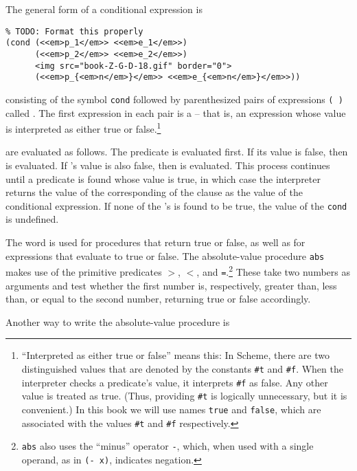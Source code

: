 The general form of a conditional expression is

\begin{verbatim}
% TODO: Format this properly
(cond (<<em>p_1</em>> <<em>e_1</em>>)
      (<<em>p_2</em>> <<em>e_2</em>>)
      <img src="book-Z-G-D-18.gif" border="0">
      (<<em>p_{<em>n</em>}</em>> <<em>e_{<em>n</em>}</em>>))
\end{verbatim}

consisting of the symbol \texttt{cond} followed by parenthesized pairs
of expressions \texttt{( )} called . The
first expression in each pair is a  -- that is, an
expression whose value is interpreted as either true or
false.\footnote{``Interpreted as either true or false'' means this: In
  Scheme, there are two distinguished values that are denoted by the
  constants \texttt{\#t} and \texttt{\#f}.  When the interpreter checks
  a predicate's value, it interprets \texttt{\#f} as false.  Any other
  value is treated as true.  (Thus, providing \texttt{\#t} is logically
  unnecessary, but it is convenient.)  In this book we will use names
  \texttt{true} and \texttt{false}, which are associated with the
  values \texttt{\#t} and \texttt{\#f} respectively.}


 are evaluated as follows.  The predicate
 is evaluated first.  If its value is false, then
 is evaluated.  If 's value is also false, then
 is evaluated.  This process continues until a predicate is
found whose value is true, in which case the interpreter returns the
value of the corresponding   of the
clause as the value of the conditional expression.  If none of the
's is found to be true, the value of the \texttt{cond} is
undefined.

The word  is used for procedures that return true or
false, as well as for expressions that evaluate to true or false.  The
absolute-value procedure \texttt{abs} makes use of the
primitive predicates \texttt{$>$}, \texttt{$<$}, and
\texttt{=}.\footnote{\texttt{abs} also uses the ``minus'' operator
  \texttt{-}, which, when used with a single operand, as in \texttt{(-
    x)}, indicates negation.}  These take two numbers as arguments and
test whether the first number is, respectively, greater than, less
than, or equal to the second number, returning true or false
accordingly.

Another way to write the absolute-value procedure is

